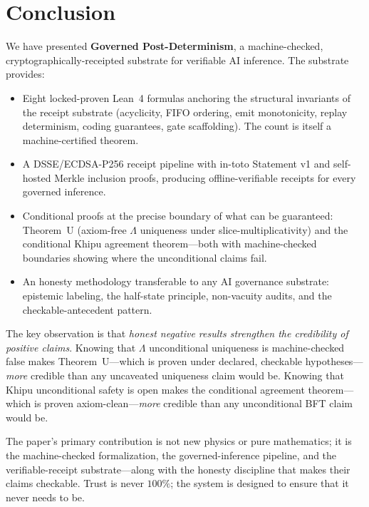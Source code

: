 \documentclass[11pt,letterpaper]{article}
\theoremstyle{definition}
\newcommand{\Lam}{\Lambda}
\begin{document}
\section{Conclusion}
\label{sec:conclusion}

We have presented \textbf{Governed Post-Determinism}, a machine-checked,
cryptographically-receipted substrate for verifiable AI inference.  The
substrate provides:
\begin{itemize}
\item Eight locked-proven Lean~4 formulas anchoring the structural invariants
  of the receipt substrate (acyclicity, FIFO ordering, emit monotonicity,
  replay determinism, coding guarantees, gate scaffolding).  The count is
  itself a machine-certified theorem.
\item A DSSE/ECDSA-P256 receipt pipeline with in-toto Statement v1 and
  self-hosted Merkle inclusion proofs, producing offline-verifiable receipts
  for every governed inference.
\item Conditional proofs at the precise boundary of what can be guaranteed:
  Theorem~U (axiom-free $\Lam$ uniqueness under slice-multiplicativity)
  and the conditional Khipu agreement theorem---both with machine-checked
  boundaries showing where the unconditional claims fail.
\item An honesty methodology transferable to any AI governance substrate:
  epistemic labeling, the half-state principle, non-vacuity audits, and the
  checkable-antecedent pattern.
\end{itemize}

The key observation is that \emph{honest negative results strengthen the
credibility of positive claims}.  Knowing that $\Lam$ unconditional uniqueness
is machine-checked false makes Theorem~U---which is proven under declared,
checkable hypotheses---\emph{more} credible than any uncaveated uniqueness
claim would be.  Knowing that Khipu unconditional safety is open makes the
conditional agreement theorem---which is proven axiom-clean---\emph{more}
credible than any unconditional BFT claim would be.

The paper's primary contribution is not new physics or pure mathematics; it is
the machine-checked formalization, the governed-inference pipeline, and the
verifiable-receipt substrate---along with the honesty discipline that makes
their claims checkable.  Trust is never $100\%$; the system is designed to
ensure that it never needs to be.
\end{document}
